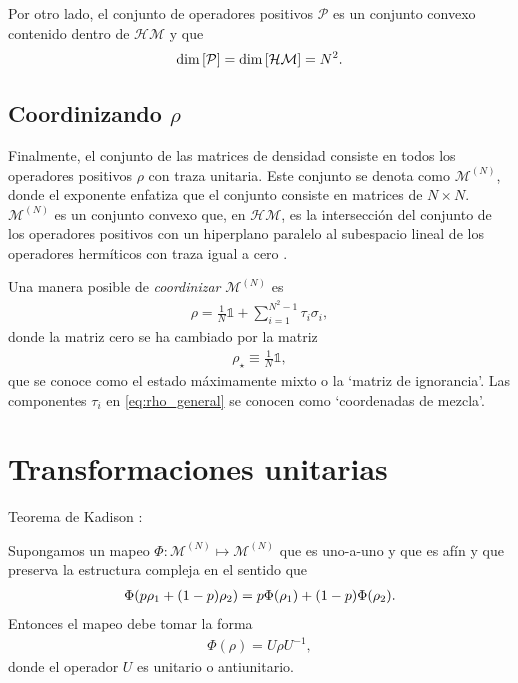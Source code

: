 \documentclass[11pt,dvipsnames]{report}
\newcommand{\M}{\mathcal{M}^{(N)}}
\begin{document}
Por otro lado, el conjunto de operadores positivos $\mathcal{P}$ es un 
conjunto convexo contenido dentro de $\mathcal{HM}$ y que
\begin{align}
	\dim \qty[\mathcal{P}] = \dim \qty[\mathcal{HM}]=N^2.
\end{align}

\subsection{Coordinizando $\rho$}
Finalmente, el conjunto de las matrices de densidad consiste en todos los operadores
positivos $\rho$ con traza unitaria. Este conjunto se denota como 
$\M$, donde el exponente enfatiza que el conjunto consiste en 
matrices de $N\times N$. $\M$ es un conjunto convexo que, en $\mathcal{HM}$, 
es la intersección del conjunto de los operadores positivos con un 
hiperplano paralelo al subespacio lineal de los operadores hermíticos
con traza igual a cero \cite{bengtsson_zyczkowski_2017}.

Una manera posible de \textit{coordinizar} $\M$ es 
\begin{align}
	\rho = \frac{1}{N} \mathbb{1} + \sum _{i=1}^{N^2-1} \tau_i\sigma_i,	
	\label{eq:rho_general}
\end{align}
donde la matriz cero se ha cambiado por la matriz
\begin{align}
	\rho _{\star} \equiv \frac{1}{N}\mathbb{1},
	\label{eq:max_mixed_state}
\end{align}
que se conoce como el estado máximamente mixto o la `matriz de ignorancia'. 
Las componentes $\tau_i$ en \eqref{eq:rho_general} se conocen como `coordenadas
de mezcla'.

\section{Transformaciones unitarias}

Teorema de Kadison \cite{bengtsson_zyczkowski_2017}:
\begin{teorema} 
	Supongamos un mapeo $\Phi:\M \mapsto \M$ que es uno-a-uno y que es afín y
	que preserva la estructura compleja en el sentido que
	\begin{align}
		\Phi \qty(p\rho_1 + \qty(1-p)\rho_2) = p\Phi(\rho_1) + 
		\qty(1-p)\Phi(\rho_2).
	\end{align}
	Entonces el mapeo debe tomar la forma
	\begin{align}
		\Phi(\rho) = U\rho U^{-1},
	\end{align}
	donde el operador $U$ es unitario o antiunitario.
\end{teorema}
\end{document}
